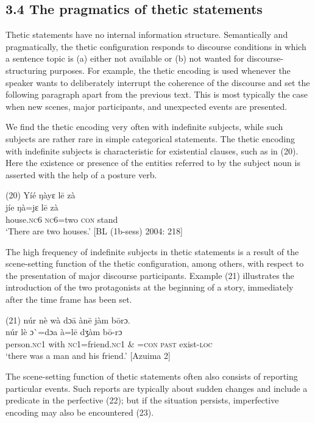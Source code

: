 \documentclass[output=paper]{langsci/langscibook}
\begin{document}
\subsection{3.4 The pragmatics of thetic statements}

Thetic statements have no internal information structure. Semantically and pragmatically, the thetic configuration responds to discourse conditions in which a sentence topic is (a) either not available or (b) not wanted for discourse-structuring purposes. For example, the thetic encoding is used whenever the speaker wants to deliberately interrupt the coherence of the discourse and set the following paragraph apart from the previous text. This is most typically the case when new scenes, major participants, and unexpected events are presented. 

We find the thetic encoding very often with indefinite subjects, while such subjects are rather rare in simple categorical statements. The thetic encoding with indefinite subjects is characteristic for existential clauses, such as in (20). Here the existence or presence of the entities referred to by the subject noun is asserted with the help of a posture verb.

\ea
\glll \textup{(20)}  Yíé    ŋàyɛ    l\={e}  zà\\
  \textup{  jíe    ŋà=jɛ    l\={e}  zà }\\
       house.\textsc{nc}6  \textsc{nc}6=two  \textsc{con}  stand\\
\glt ‘There are two houses.’ [BL (1b-sess) 2004: 218]
\z

The high frequency of indefinite subjects in thetic statements is a result of the scene-setting function of the thetic configuration, among others, with respect to the presentation of major discourse participants. Example (21) illustrates the introduction of the two protagonists at the beginning of a story, immediately after the time frame has been set. 

\ea
\glll \textup{(21)}  núr    nè  wà   dɔ\={a}    àn\={e}    jàm  b\={o}rɔ.\\
  \textup{  núr    lè  }ɔ\`{ }\textup{=dɔa      à=l\={e}    dʒàm  b\={o}-rɔ}\\
       person.\textsc{nc}1  with  \textsc{nc}1=friend.\textsc{nc}1  \& =\textsc{con}  \textsc{past}  exist-\textsc{loc}\\
\glt ‘there was a man and his friend.’ [Azuima 2]
\z

The scene-setting function of thetic statements often also consists of reporting particular events. Such reports are typically about sudden changes and include a predicate in the perfective (22); but if the situation persists, imperfective encoding may also be encountered (23).
\end{document}
